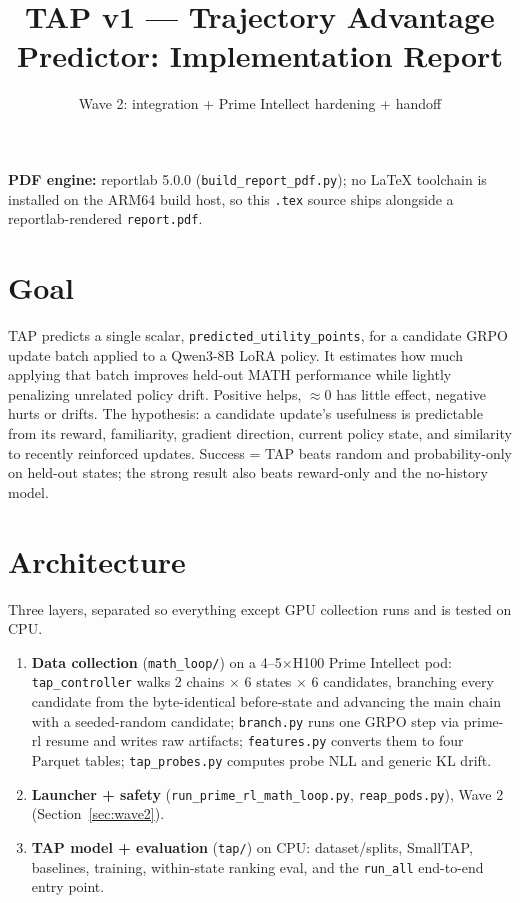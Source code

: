 \documentclass[11pt]{article}
\title{TAP v1 --- Trajectory Advantage Predictor: Implementation Report}
\author{Wave 2: integration + Prime Intellect hardening + handoff}
\date{}
\begin{document}
\maketitle

\noindent\textbf{PDF engine:} reportlab 5.0.0 (\texttt{build\_report\_pdf.py}); no
LaTeX toolchain is installed on the ARM64 build host, so this \texttt{.tex} source
ships alongside a reportlab-rendered \texttt{report.pdf}.

\section{Goal}
TAP predicts a single scalar, \texttt{predicted\_utility\_points}, for a candidate
GRPO update batch applied to a Qwen3-8B LoRA policy. It estimates how much applying
that batch improves held-out MATH performance while lightly penalizing unrelated
policy drift. Positive helps, $\approx 0$ has little effect, negative hurts or
drifts. The hypothesis: a candidate update's usefulness is predictable from its
reward, familiarity, gradient direction, current policy state, and similarity to
recently reinforced updates. Success = TAP beats random and probability-only on
held-out states; the strong result also beats reward-only and the no-history model.

\section{Architecture}
Three layers, separated so everything except GPU collection runs and is tested on CPU.
\begin{enumerate}
  \item \textbf{Data collection} (\texttt{math\_loop/}) on a 4--5$\times$H100 Prime
  Intellect pod: \texttt{tap\_controller} walks 2 chains $\times$ 6 states $\times$
  6 candidates, branching every candidate from the byte-identical before-state and
  advancing the main chain with a seeded-random candidate; \texttt{branch.py} runs
  one GRPO step via prime-rl resume and writes raw artifacts; \texttt{features.py}
  converts them to four Parquet tables; \texttt{tap\_probes.py} computes probe NLL
  and generic KL drift.
  \item \textbf{Launcher + safety} (\texttt{run\_prime\_rl\_math\_loop.py},
  \texttt{reap\_pods.py}), Wave 2 (Section~\ref{sec:wave2}).
  \item \textbf{TAP model + evaluation} (\texttt{tap/}) on CPU: dataset/splits,
  SmallTAP, baselines, training, within-state ranking eval, and the
  \texttt{run\_all} end-to-end entry point.
\end{enumerate}
\end{document}
